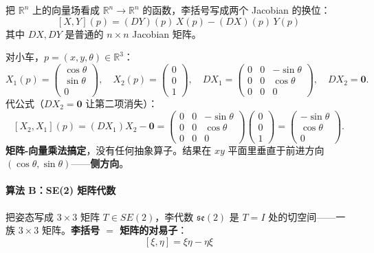 \documentclass[11pt,a4paper]{article}
\theoremstyle{mythm}
\theoremstyle{mydef}
\newcommand{\R}{\mathbb{R}}
\begin{document}
把 $\R^n$ 上的向量场看成 $\R^n \to \R^n$ 的函数，李括号写成两个 Jacobian 的换位：
\begin{equation}\label{eq:lie-jacobian}
\boxed{\quad [X, Y](p) = (DY)(p)\,X(p) - (DX)(p)\,Y(p)\quad}
\end{equation}
其中 $DX, DY$ 是普通的 $n\times n$ Jacobian 矩阵。

对小车，$p = (x, y, \theta)\in\R^3$：
$$X_1(p) = \begin{pmatrix}\cos\theta\\ \sin\theta\\ 0\end{pmatrix},\quad X_2(p) = \begin{pmatrix}0\\ 0\\ 1\end{pmatrix},\quad DX_1 = \begin{pmatrix}0 & 0 & -\sin\theta\\ 0 & 0 & \cos\theta\\ 0 & 0 & 0\end{pmatrix},\quad DX_2 = \mathbf{0}.$$
代公式（$DX_2 = \mathbf{0}$ 让第二项消失）：
$$[X_2, X_1](p) = (DX_1)X_2 - \mathbf{0} = \begin{pmatrix}0 & 0 & -\sin\theta\\ 0 & 0 & \cos\theta\\ 0 & 0 & 0\end{pmatrix}\!\begin{pmatrix}0\\ 0\\ 1\end{pmatrix} = \begin{pmatrix}-\sin\theta\\ \cos\theta\\ 0\end{pmatrix}.$$
\textbf{矩阵-向量乘法搞定}，没有任何抽象算子。结果在 $xy$ 平面里垂直于前进方向 $(\cos\theta, \sin\theta)$——\textbf{侧方向}。

\paragraph{算法 B：SE(2) 矩阵代数}

把姿态写成 $3\times 3$ 矩阵 $T \in SE(2)$，李代数 $\mathfrak{se}(2)$ 是 $T = I$ 处的切空间——一族 $3\times 3$ 矩阵。\textbf{李括号 $=$ 矩阵的对易子}：
\begin{equation}\label{eq:lie-matrix}
\boxed{\quad [\xi, \eta] = \xi\eta - \eta\xi\quad}
\end{equation}
\end{document}
